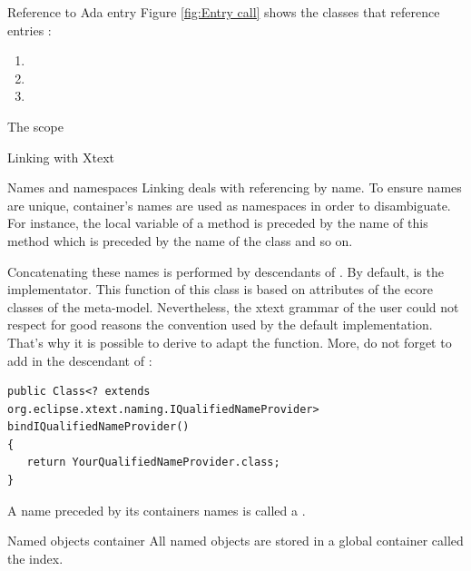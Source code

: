\documentclass[a4paper]{prjdoc}
\begin{document}
\begin{asection}{Reference to Ada entry}
     Figure \ref{fig:Entry call} shows the classes that reference entries :
        \begin{enumerate}
        \item {}
        \item {}
        \item {}
        \end{enumerate} 
     
     \begin{asection}{The scope}
     
     \end{asection} %
  
  \end{asection} %
  
  \begin{asection}{Linking with Xtext}
     \begin{asection}{Names and namespaces}
     Linking deals with referencing by name.
     To ensure names are unique, container's names are used as namespaces in order to disambiguate.
     For instance, the local variable of a method is preceded by the name of this method which 
     is preceded by the name of the class and so on. 
     
     Concatenating these names is performed by descendants of . 
     By default,  is the implementator.
     This function of this class is based on attributes  of the ecore classes of the meta-model.  
     Nevertheless, the xtext grammar of the user could not respect for good reasons the convention used by the default implementation.
     That's why it is possible to derive  to adapt the function. 
     More, do not forget to add in the descendant of  :
     \begin{lstlisting}
public Class<? extends org.eclipse.xtext.naming.IQualifiedNameProvider> 
bindIQualifiedNameProvider() 
{
   return YourQualifiedNameProvider.class;
}
     \end{lstlisting}
     A name preceded by its containers names is called a .    
       
     \end{asection} %
     
     \begin{asection}{Named objects container}
     All named objects are stored in a global container called the index.
     
     
     \end{asection} %
  
  \end{asection} %
\end{document}
